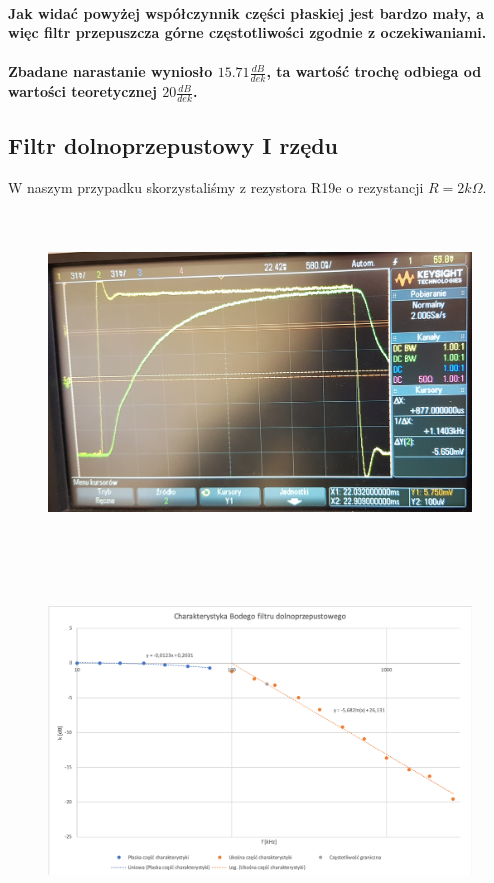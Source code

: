 \documentclass[a4paper,12pt]{article}
\begin{document}
\begin{justify}
\paragraph{Jak widać powyżej współczynnik części płaskiej jest bardzo mały, a więc filtr przepuszcza górne częstotliwości zgodnie z oczekiwaniami. }

\paragraph{Zbadane narastanie wyniosło $15.71 \frac{dB}{dek}$, ta wartość trochę odbiega od wartości teoretycznej $20 \frac{dB}{dek}$.}

\newpage

\subsection{Filtr dolnoprzepustowy I rzędu}

W naszym przypadku skorzystaliśmy z rezystora R19e o rezystancji $R = 2k \Omega$. 

\begin{figure}[h]
\centering
\includegraphics[width=15cm, height=9cm]{dolny_1}
\end{figure}

\begin{figure}[h]
\centering
\includegraphics[width=15cm, height=9cm]{2_wykr}
\end{figure}


\end{justify}
\end{document}
